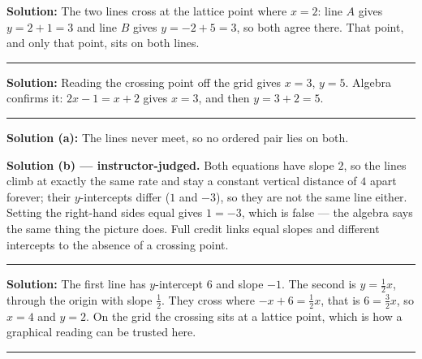 \documentclass[12pt]{article}
\begin{document}



\textbf{Solution:} \quad The two lines cross at the lattice point where $x = 2$: line $A$ gives
$y = 2 + 1 = 3$ and line $B$ gives $y = -2 + 5 = 3$, so both agree there. That point, and only that
point, sits on both lines. 

\vspace{0.15cm}\noindent\rule{\linewidth}{0.2pt}


\textbf{Solution:} \quad Reading the crossing point off the grid gives $x = 3$, $y = 5$. Algebra
confirms it: $2x - 1 = x + 2$ gives $x = 3$, and then $y = 3 + 2 = 5$. 

\vspace{0.15cm}\noindent\rule{\linewidth}{0.2pt}


\textbf{Solution (a):} \quad The lines never meet, so no ordered pair lies on both.

\noindent\textbf{Solution (b) --- instructor-judged.} Both equations have slope $2$, so the lines
climb at exactly the same rate and stay a constant vertical distance of $4$ apart forever; their
$y$-intercepts differ ($1$ and $-3$), so they are not the same line either. Setting the right-hand
sides equal gives $1 = -3$, which is false --- the algebra says the same thing the picture does.
Full credit links equal slopes and different intercepts to the absence of a crossing point.

\vspace{0.15cm}\noindent\rule{\linewidth}{0.2pt}


\textbf{Solution:} \quad The first line has $y$-intercept $6$ and slope $-1$. The second is
$y = \tfrac{1}{2}x$, through the origin with slope $\tfrac{1}{2}$. They cross where
$-x + 6 = \tfrac{1}{2}x$, that is $6 = \tfrac{3}{2}x$, so $x = 4$ and $y = 2$. On the grid the
crossing sits at a lattice point, which is how a graphical reading can be trusted here.

\vspace{0.15cm}\noindent\rule{\linewidth}{0.2pt}
\end{document}
